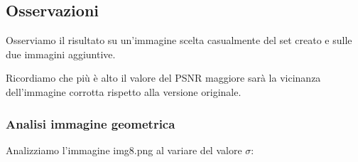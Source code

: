 \subsection{Osservazioni}
Osserviamo il risultato su un'immagine scelta casualmente del set creato e sulle due immagini aggiuntive.

Ricordiamo che più è alto il valore del PSNR maggiore sarà la vicinanza dell'immagine corrotta rispetto alla versione originale. 

\subsubsection{Analisi immagine geometrica}
Analizziamo l'immagine img8.png al variare del valore $\sigma$:

